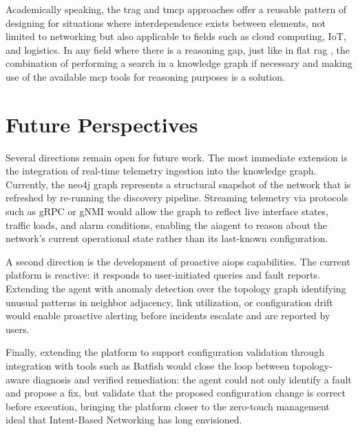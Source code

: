 \documentclass[11pt,a4paper]{report}
\begin{document}
Academically speaking, the  \gls{trag}  and  \gls{tmcp}  approaches offer a reusable pattern of designing for situations where interdependence exists between elements, not limited to networking but also applicable to fields such as cloud computing, IoT, and logistics. In any field where there is a reasoning gap, just like in flat  \gls{rag} , the combination of performing a search in a knowledge graph if necessary and making use of the available \gls{mcp}  tools for reasoning purposes is a solution.
\section{Future Perspectives}

Several directions remain open for future work. The most immediate extension is the integration of real-time telemetry ingestion into the knowledge graph. Currently, the  \gls{neo4j}  graph represents a structural snapshot of the network that is refreshed by re-running the discovery pipeline. Streaming telemetry via protocols such as gRPC or gNMI would allow the graph to reflect live interface states, traffic loads, and alarm conditions, enabling the \gls{ai}agent to reason about the network's current operational state rather than its last-known configuration.

A second direction is the development of proactive \gls{aiops} capabilities. The current platform is reactive: it responds to user-initiated queries and fault reports. Extending the agent with anomaly detection over the topology graph  identifying unusual patterns in neighbor adjacency, link utilization, or configuration drift  would enable proactive alerting before incidents escalate and are reported by users.


Finally, extending the platform to support configuration validation through integration with tools such as Batfish would close the loop between topology-aware diagnosis and verified remediation: the agent could not only identify a fault and propose a fix, but validate that the proposed configuration change is correct before execution, bringing the platform closer to the zero-touch management ideal that Intent-Based Networking has long envisioned.





\end{document}
